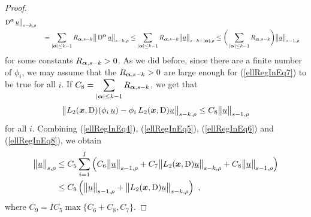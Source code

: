 \begin{proof}
\begin{align}
\operatorname{D}^{{\bm{\alpha}}} \underline{u} \big\|_{s-k,\rho} \nonumber \\
&\quad = \sum_{|{\bm{\alpha}}|\leq k-1} R_{{\bm{\alpha}},s-k}
\big\|\operatorname{D}^{{\bm{\alpha}}} \underline{u} \big\|_{s-k,\rho}
\leq \sum_{|{\bm{\alpha}}|\leq k-1} R_{{\bm{\alpha}},s-k}
\big\| \underline{u} \big\|_{s-k+|{\bm{\alpha}}|,\rho}
\leq \bigg( \sum_{|{\bm{\alpha}}|\leq k-1} R_{{\bm{\alpha}},s-k} \bigg)
\big\| \underline{u} \big\|_{s-1,\rho} \label{ellRegInEq7}
\end{align}
for some constants $R_{{\bm{\alpha}},s-k}>0$.
As we did before, since there are a finite number of $\phi_i$, we may
assume that the $R_{{\bm{\alpha}},s-k}>0$ are large
enough for (\ref{ellRegInEq7}) to be true for all $i$.
If $\displaystyle C_8 = \sum_{|{\bm{\alpha}}|\leq k-1} R_{{\bm{\alpha}},s-k}$,
we get that
\begin{equation} \label{ellRegInEq8}
\big\|L_2({\bm{x}},\operatorname{D})(\phi_i\,\underline{u})
- \phi_i\, L_2({\bm{x}},\operatorname{D})\underline{u} \big\|_{s-k,\rho}
\leq C_8 \big\| \underline{u} \big\|_{s-1,\rho}
\end{equation}
for all $i$.  Combining (\ref{ellRegInEq4}), (\ref{ellRegInEq5}),
(\ref{ellRegInEq6}) and (\ref{ellRegInEq8}), we obtain
\begin{align}
\big\|\underline{u}\big\|_{s,\rho}
&\leq C_5 \sum_{i=1}^I  
\left( C_6 \big\|\underline{u}\big\|_{s-1,\rho} 
+ C_7 \big\|L_2({\bm{x}},\operatorname{D})\underline{u}\big\|_{s-k,\rho}
+ C_8 \big\| \underline{u} \big\|_{s-1,\rho} \right) \nonumber \\
&\leq C_9 \left( \big\|\underline{u}\big\|_{s-1,\rho}
+ \big\|L_2({\bm{x}},\operatorname{D})\underline{u}\big\|_{s-k,\rho} \right) \ ,
\label{ellRegInEq9}
\end{align}
where $C_9 = I C_5 \max\{ C_6 + C_8, C_7\}$.


\end{proof}
